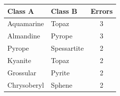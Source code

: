 \begin{tabular}{llc}
\toprule
Class A & Class B & Errors \\
\midrule
Aquamarine & Topaz & 3 \\
Almandine & Pyrope & 3 \\
Pyrope & Spessartite & 2 \\
Kyanite & Topaz & 2 \\
Grossular & Pyrite & 2 \\
Chrysoberyl & Sphene & 2 \\
\bottomrule
\end{tabular}

